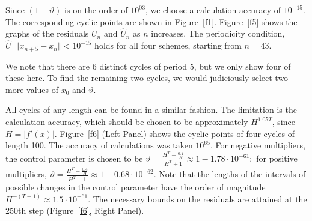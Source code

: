 \documentclass[12pt,a4paper]{amsart}
\begin{document}
Since $(1 - \vartheta)$ is on the order of $10^{03}$, we choose a  calculation accuracy of $10^{-15}.$ The corresponding cyclic points are shown in Figure~\ref{f1}. Figure~\ref{f5} shows 
the graphs of the residuals $U_n$ and $\hat{U}_n$ as $n$ increases. The periodicity condition, $\hat{U}_ = \Vert x_{n+5} - x_n\Vert < 10^{-15}$ holds for all four schemes, 
starting from $n=43.$

We note that there are 6 distinct cycles of period 5, but we only show four of these here.  To find the remaining two cycles, we would judiciously select two more values of $x_0$ and $\vartheta$.

All cycles of any length can be found in a similar fashion.  The limitation is the calculation accuracy, which should be chosen to be approximately $H^{1.05 T}$, since $H = |f'(x)|$. 
Figure~\ref{f6} (Left Panel) shows the cyclic points of four cycles of length 100. The accuracy of calculations was taken $10^{65}.$ For negative multipliers, 
the control parameter is chosen to be $\vartheta = \displaystyle{\frac{H^T - \frac{0.4}{H}}{H^T+1}} \approx 1 - 1.78 \cdot 10^{-61};$ for positive multipliers, 
$\vartheta = \displaystyle{ \frac{H^T + \frac{0.4}{H}}{H^T-1}} \approx  1 + 0.68 \cdot10^{-62}.$ Note that the lengths of the intervals of possible changes 
in the control parameter have the order of magnitude $H^{-(T+1)} \approx 1.5 \cdot 10^{-61}$. 
The necessary bounds on the residuals are attained at the 250th step (Figure~\ref{f6}, Right Panel).
\end{document}
